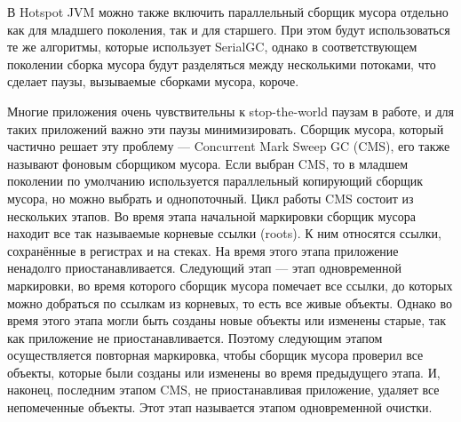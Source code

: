 \documentclass[12pt,a4paper]{article}
\begin{document}
В Hotspot JVM можно также включить параллельный сборщик мусора отдельно как для младшего поколения, 
так и для старшего. При этом будут использоваться те же алгоритмы, которые
использует SerialGC, однако в соответствующем поколении сборка мусора будут разделяться между несколькими 
потоками, что сделает паузы, вызываемые сборками мусора, короче.

Многие приложения очень чувствительны к stop-the-world паузам в работе, и для таких приложений
важно эти паузы минимизировать. Сборщик мусора, который частично решает эту проблему — 
Concurrent Mark Sweep GC (CMS), его также называют фоновым сборщиком мусора.
Если выбран CMS, то в младшем поколении по умолчанию используется параллельный копирующий
сборщик мусора, но можно выбрать и однопоточный. Цикл работы CMS состоит из нескольких этапов.
Во время этапа начальной маркировки сборщик мусора находит все так называемые 
корневые ссылки (roots). К ним относятся ссылки, сохранённые в регистрах и на стеках. На время
этого этапа приложение ненадолго приостанавливается. Следующий этап --- этап одновременной
маркировки, во время которого сборщик мусора помечает все ссылки, до которых 
можно добраться по ссылкам из корневых, то есть все живые объекты. Однако
во время этого этапа могли быть созданы новые объекты или изменены старые, так как приложение
не приостанавливается. Поэтому следующим этапом осуществляется повторная маркировка, чтобы
сборщик мусора проверил все объекты, которые были созданы или изменены во время предыдущего
этапа. И, наконец, последним этапом CMS, не приостанавливая приложение, удаляет все
непомеченные объекты. Этот этап называется этапом одновременной очистки.
\end{document}
